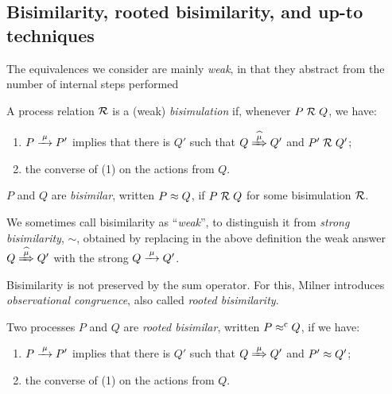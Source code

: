\subsection{Bisimilarity, rooted bisimilarity,  and up-to techniques}
\label{ss:BiEx}

The equivalences we consider are  mainly
 \emph{weak}, in that they
abstract from the number of internal steps performed
\begin{definition}[bisimilarity]
\label{d:wb}
A process relation ${{\cal R}}$ 
 is a (weak) \emph{bisimulation} if, whenever
 $P\mathrel{\cal R} Q$, %
we have:
\begin{enumerate}
\item 
    $P \arr\mu P'$   implies that there is $Q'$ such that $Q \Arcap \mu Q'$ and $P' \mathrel{\cal R} Q'$;
\item the converse of (1)
 on the actions from $Q$.
\end{enumerate}  
 $P$ and $Q$ are \emph{bisimilar},
written $P \approx
 Q$, if $P \mathrel{\cal R} Q$ for some  bisimulation ${\cal R}$.  
\end{definition} 

We sometimes call bisimilarity as ``\emph{weak}'', to
distinguish it from \emph{strong bisimilarity}, $\sim$,
obtained by replacing in the above definition   the weak answer $
Q\Arcap\mu Q'$ with the strong  $Q \arr \mu Q'$.

Bisimilarity is not preserved by the sum operator. 
For this, Milner introduces \emph{observational congruence}, also called \emph{rooted
  bisimilarity}.
\begin{definition}
\label{d:rootedBisimilarity}
Two processes $P$ and $Q$ are \emph{rooted bisimilar}, written $P
\mathrel{\approx^{\rm{c}}} Q$, if we have:
\begin{enumerate}
 \item  $P \arr\mu P'$ implies that there is $Q'$ such that $Q
   \Arr\mu Q'$ and $P' \approx Q'$;
\item the converse of (1) on the actions from $Q$.
\end{enumerate}
\end{definition}


